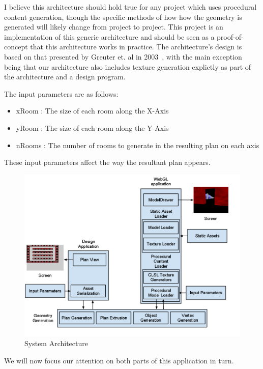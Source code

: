 I believe this architecture should hold true for any project which uses procedural content generation, though the specific methods of how how the geometry is generated will likely change from project to project.
This project is an implementation of this generic architecture and should be seen as a proof-of-concept that this architecture works in practice.
The architecture's design is based on that presented by Greuter et. al in 2003~\cite{greuter2003undiscovered}, with the main exception being that our architecture also includes texture generation explictly as part of the architecture and a design program.

The input parameters are as follows:
\begin{itemize}
	\item xRoom : The size of each room along the X-Axis
	\item yRoom : The size of each room along the Y-Axis
	\item nRooms : The number of rooms to generate in the resulting plan on each axis
\end{itemize}
These input parameters affect the way the resultant plan appears.

\begin{figure}
  \centering
  \includegraphics[width=\textwidth]{images/gwtprocArchitecture}
  \caption{System Architecture}
  \label{fig:sysarch}
\end{figure}

We will now focus our attention on both parts of this application in turn.

